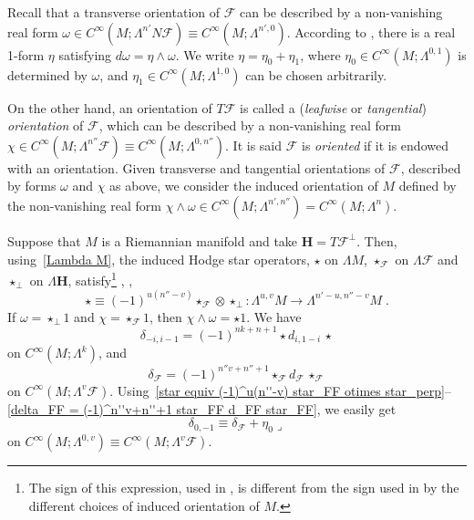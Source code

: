 \documentclass{memo-l}
\theoremstyle{plain}
\theoremstyle{definition}
\theoremstyle{remark}
\newcommand{\FF}{\mathcal{F}}
\newcommand{\bfH}{\boldsymbol{H}}
\numberwithin{section}{chapter}
\numberwithin{equation}{section}%
\begin{document}
Recall that a transverse orientation of $\FF$ can be described by a non-vanishing real form $\omega\in C^\infty(M;\Lambda^{n'}N\FF)\equiv C^\infty(M;\Lambda^{n',0})$. According to , there is a real 1-form $\eta$ satisfying $d\omega=\eta\wedge\omega$. We write $\eta=\eta_0+\eta_1$, where $\eta_0\in C^\infty(M;\Lambda^{0,1})$ is determined by $\omega$, and $\eta_1\in C^\infty(M;\Lambda^{1,0})$ can be chosen arbitrarily. 

On the other hand, an orientation of $T\FF$ is called a (\emph{leafwise} or \emph{tangential}) \emph{orientation} of $\FF$, which can be described by a non-vanishing real form $\chi\in C^\infty(M;\Lambda^{n''}\FF)\equiv C^\infty(M;\Lambda^{0,n''})$. It is said $\FF$ is \emph{oriented}  if it is endowed with an orientation. Given transverse and tangential orientations of $\FF$, described by forms $\omega$ and $\chi$ as above, we consider the induced orientation of $M$ defined by the non-vanishing real form $\chi\wedge\omega\in C^\infty(M;\Lambda^{n',n''})=C^\infty(M;\Lambda^n)$.

Suppose that $M$ is a Riemannian manifold and take $\bfH=T\FF^\perp$. Then, using~\eqref{Lambda M}, the induced Hodge star operators, $\star$ on $\Lambda M$, $\star_\FF$ \index{$\star_\FF$} on $\Lambda\FF$ and $\star_\perp$ \index{$\star_\perp$} on $\Lambda\bfH$, satisfy\footnote{The sign of this expression, used in \cite[Eq.~(42)]{AlvKordyLeichtnam2020}, is different from the sign used in \cite[Lemma~3.2]{AlvKordy2001} by the different choices of induced orientation of $M$.} \cite[Lemma~4.8]{AlvTond1991}, \cite[Lemma~3.2]{AlvKordy2001}, \cite[Eq.~(42)]{AlvKordyLeichtnam2020}
\begin{equation}\label{star equiv (-1)^u(n''-v) star_FF otimes star_perp}
\star\equiv(-1)^{u(n''-v)}{\star_\FF}\otimes{\star_\perp}:\Lambda^{u,v}M\to\Lambda^{n'-u,n''-v}M\;.
\end{equation}
If $\omega=\star_\perp1$ and $\chi=\star_\FF1$, then $\chi\wedge\omega=\star1$. We have
\begin{equation}\label{delta_-i i-1 = (-1)^nk+n+1 star d_i 1-i star}
\delta_{-i,i-1}=(-1)^{nk+n+1}\star d_{i,1-i}\,\star
\end{equation}
on $C^\infty(M;\Lambda^k)$, and
\begin{equation}\label{delta_FF = (-1)^n''v+n''+1 star_FF d_FF star_FF}
\delta_\FF=(-1)^{n''v+n''+1}\star_\FF d_\FF\,\star_\FF
\end{equation}
on $C^\infty(M;\Lambda^v\FF)$. Using~\eqref{star equiv (-1)^u(n''-v) star_FF otimes star_perp}--\eqref{delta_FF = (-1)^n''v+n''+1 star_FF d_FF star_FF}, we easily get
\[
\delta_{0,-1}\equiv\delta_\FF+{\eta_0\lrcorner}
\]
on $C^\infty(M;\Lambda^{0,v})\equiv C^\infty(M;\Lambda^v\FF)$.
\end{document}
